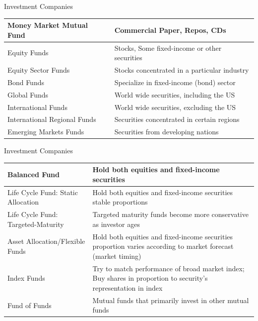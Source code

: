 \documentclass{beamer}
\begin{document}
\begin{frame}{Investment Companies}
\begin{center}
\footnotesize
\begin{tabular}{l|l}
Money Market Mutual Fund & Commercial Paper, Repos, CDs\\ \hline
Equity Funds & 	Stocks, Some fixed-income or other securities\\ \hline
Equity Sector Funds & Stocks concentrated in a particular industry\\ \hline
Bond Funds & Specialize in fixed-income (bond) sector\\ \hline
Global Funds & World wide securities, including the US\\ \hline
International Funds & World wide securities, excluding the US\\ \hline
International Regional Funds & Securities concentrated in certain regions\\ \hline
Emerging Markets Funds & Securities from developing nations
\end{tabular}
\end{center}
\end{frame}

\begin{frame}{Investment Companies}
\begin{center}
\footnotesize
\begin{tabular}{l|p{2in}}
Balanced Fund & Hold both equities and fixed-income securities\\ \hline 
Life Cycle Fund: Static Allocation & Hold both equities and fixed-income securities stable proportions\\ \hline
Life Cycle Fund: Targeted-Maturity & Targeted maturity funds become more conservative as investor ages\\ \hline Asset Allocation/Flexible Funds & Hold both equities and fixed-income securities proportion varies according to market forecast (market timing)\\ \hline
Index Funds & Try to match performance of broad market index; Buy shares in proportion to security's representation in index\\ \hline
Fund of Funds & Mutual funds that primarily invest in other mutual funds
\end{tabular}
\end{center}
\end{frame}
\end{document}
